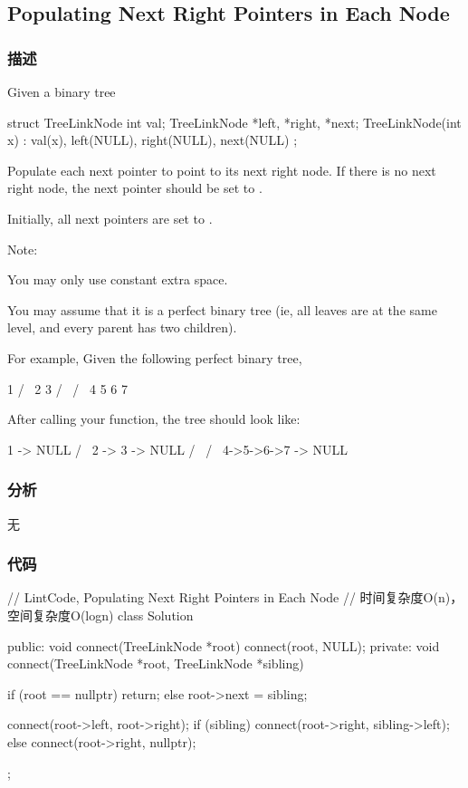 \subsection{Populating Next Right Pointers in Each Node} %
\label{sec:populating-next-right-pointers-in-each-node}


\subsubsection{描述}
Given a binary tree
\begin{Code}
struct TreeLinkNode {
   int val;
   TreeLinkNode *left, *right, *next;
   TreeLinkNode(int x) : val(x), left(NULL), right(NULL), next(NULL) {}
};
\end{Code}

Populate each next pointer to point to its next right node. If there is no next right node, the next pointer should be set to .

Initially, all next pointers are set to .

Note:
\begindot
\item You may only use constant extra space.
\item You may assume that it is a perfect binary tree (ie, all leaves are at the same level, and every parent has two children).
\myenddot

For example,
Given the following perfect binary tree,
\begin{Code}
         1
       /  \
      2    3
     / \  / \
    4  5  6  7
\end{Code}

After calling your function, the tree should look like:
\begin{Code}
         1 -> NULL
       /  \
      2 -> 3 -> NULL
     / \  / \
    4->5->6->7 -> NULL
\end{Code}


\subsubsection{分析}
无

\subsubsection{代码}

\begin{Code}
// LintCode, Populating Next Right Pointers in Each Node
// 时间复杂度O(n)，空间复杂度O(logn)
class Solution {
public:
    void connect(TreeLinkNode *root) {
        connect(root, NULL);
    }
private:
    void connect(TreeLinkNode *root, TreeLinkNode *sibling) {
        if (root == nullptr)
            return;
        else
            root->next = sibling;

        connect(root->left, root->right);
        if (sibling)
            connect(root->right, sibling->left);
        else
            connect(root->right, nullptr);
    }
};
\end{Code}


